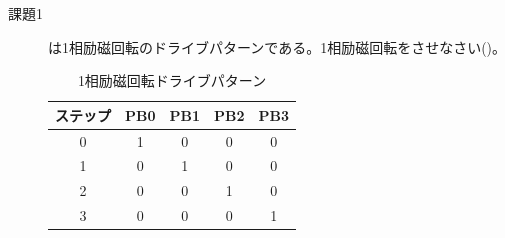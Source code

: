 \begin{description}
\item[課題1] は1相励磁回転のドライブパターンである。1相励磁回転をさせなさい()。


\begin{table}
\begin{center}
\caption{1相励磁回転ドライブパターン}
\label{tab:1sou}
\begin{tabular}{|c|c|c|c|c|}
\hline
ステップ&PB0& PB1&  PB2&  PB3\\ \hline
       0&  1&   0&    0&    0\\ \hline
       1&  0&   1&    0&    0\\ \hline
       2&  0&   0&    1&    0\\ \hline
       3&  0&   0&    0&    1\\
\hline
\end{tabular}
\end{center}
\end{table}




\end{description}
